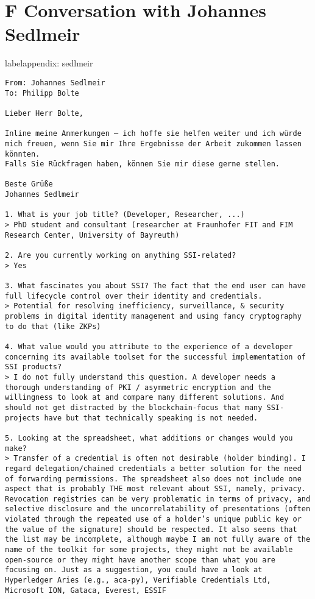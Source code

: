 \section*{F Conversation with Johannes Sedlmeir}label{appendix: sedlmeir}
\begin{Verbatim}[breaklines=true, breaksymbol={}, breaksymbolsepleftnchars=2]
From: Johannes Sedlmeir
To: Philipp Bolte

Lieber Herr Bolte,
 
Inline meine Anmerkungen – ich hoffe sie helfen weiter und ich würde mich freuen, wenn Sie mir Ihre Ergebnisse der Arbeit zukommen lassen könnten.
Falls Sie Rückfragen haben, können Sie mir diese gerne stellen.
 
Beste Grüße
Johannes Sedlmeir

1. What is your job title? (Developer, Researcher, ...) 
> PhD student and consultant (researcher at Fraunhofer FIT and FIM Research Center, University of Bayreuth)

2. Are you currently working on anything SSI-related? 
> Yes

3. What fascinates you about SSI? The fact that the end user can have full lifecycle control over their identity and credentials. 
> Potential for resolving inefficiency, surveillance, & security problems in digital identity management and using fancy cryptography to do that (like ZKPs)

4. What value would you attribute to the experience of a developer concerning its available toolset for the successful implementation of SSI products? 
> I do not fully understand this question. A developer needs a thorough understanding of PKI / asymmetric encryption and the willingness to look at and compare many different solutions. And should not get distracted by the blockchain-focus that many SSI-projects have but that technically speaking is not needed.

5. Looking at the spreadsheet, what additions or changes would you make? 
> Transfer of a credential is often not desirable (holder binding). I regard delegation/chained credentials a better solution for the need of forwarding permissions. The spreadsheet also does not include one aspect that is probably THE most relevant about SSI, namely, privacy. Revocation registries can be very problematic in terms of privacy, and selective disclosure and the uncorrelatability of presentations (often violated through the repeated use of a holder’s unique public key or the value of the signature) should be respected. It also seems that the list may be incomplete, although maybe I am not fully aware of the name of the toolkit for some projects, they might not be available open-source or they might have another scope than what you are focusing on. Just as a suggestion, you could have a look at Hyperledger Aries (e.g., aca-py), Verifiable Credentials Ltd, Microsoft ION, Gataca, Everest, ESSIF


\end{Verbatim}
